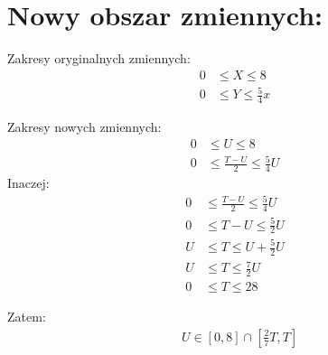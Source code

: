 \documentclass[12pt]{article}
\begin{document}
\section*{Nowy obszar zmiennych:}

Zakresy oryginalnych zmiennych: \\
\begin{align*}
    0 &\leq X \leq 8 \\
    0 &\leq Y \leq \frac{5}{4}x
\end{align*}

Zakresy nowych zmiennych: \\
\begin{align*}
    0 &\leq U \leq 8 \\
    0 &\leq \frac{T - U}{2} \leq \frac{5}{4}U
\end{align*}
Inaczej:
\begin{align*}
    0 &\leq \frac{T - U}{2} \leq \frac{5}{4}U \\
    0 &\leq T - U \leq \frac{5}{2}U \\
    U &\leq T \leq U + \frac{5}{2}U \\
    U &\leq T \leq \frac{7}{2}U \\
    0 &\leq T \leq 28
\end{align*}

Zatem: 
\begin{align*}
    &U \in [0, 8]  \cap  [\frac{2}{7}T, T]\\
\end{align*}
\end{document}
